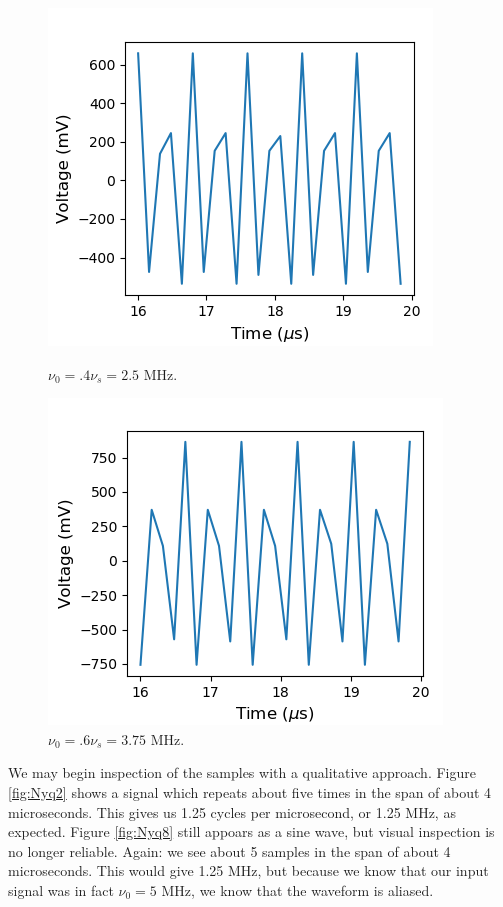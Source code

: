 \documentclass[a4paper]{article}
\begin{document}
\begin{figure}
\centering
\begin{minipage}{.5\textwidth}
	\centering
	\includegraphics[width=.8\linewidth]{5-2/trial4}
	\caption{$\nu_0 = .4 \nu_s = 2.5$ MHz.}
	\label{fig:Nyq4}
\end{minipage}%
\begin{minipage}{.5\textwidth}
	\centering
	\includegraphics[width=.8\linewidth]{5-2/trial6}
	\caption{$\nu_0 = .6 \nu_s = 3.75$ MHz.}
	\label{fig:Nyq6}
\end{minipage}
\end{figure}
	
We may begin inspection of the samples with a qualitative approach. Figure \ref{fig:Nyq2} shows a signal which repeats about five times in the span of about 4 microseconds. This gives us 1.25 cycles per microsecond, or 1.25 MHz, as expected. Figure \ref{fig:Nyq8} still appoars as a sine wave, but visual inspection is no longer reliable. Again: we see about 5 samples in the span of about 4 microseconds. This would give 1.25 MHz, but because we know that our input signal was in fact $\nu_0 = 5$ MHz, we know that the waveform is aliased.
\end{document}
